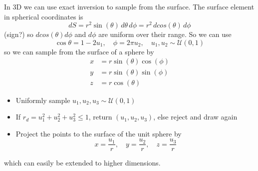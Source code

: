 
In 3D we can use exact inversion to sample from the surface. The surface element in spherical coordinates is
\begin{equation}
    dS = r^2 \sin(\theta) \, d\theta \, d\phi = r^2 \, d cos(\theta) \, d\phi
\end{equation}
(sign?) so $d cos(\theta) d\phi$ and $d \phi$ are uniform over their range. So we can use
\begin{equation}
    \cos \theta = 1 - 2u_1, \quad \phi = 2\pi u_2, \quad u_1, u_2 \sim \mathcal{U}(0,1)
\end{equation}
so we can sample from the surface of a sphere by
\begin{equation}
    \begin{aligned}
        x &= r \sin(\theta) \cos(\phi) \\
        y &= r \sin(\theta) \sin(\phi) \\
        z &= r \cos(\theta)
    \end{aligned}
\end{equation}


\begin{itemize}
    \item Uniformly sample $u_1, u_2, u_3 \sim \mathcal{U}(0,1)$
    \item If $r_d = u_1^2 + u_2^2 + u_3^2 \leq 1$, return $(u_1, u_2, u_3)$, else reject and draw again
    \item Project the points to the surface of the unit sphere by
    \begin{equation}
            x = \frac{u_1}{r}, \quad y = \frac{u_2}{r}, \quad z = \frac{u_3}{r}
    \end{equation}
\end{itemize}
which can easily be extended to higher dimensions.

